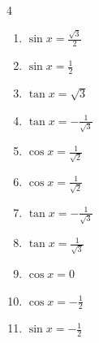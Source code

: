 \begin{multicols}{4}
\begin{enumerate}
  \item $\displaystyle \sin{x}  = \frac{\sqrt{3}}{2}$


  \item $\displaystyle \sin{x}  = \frac{1}{2}$


  \item $\displaystyle \tan{x}  = \sqrt{3}$


  \item $\displaystyle \tan{x}  = -\frac{1}{\sqrt{3}}$


  \item $\displaystyle \cos{x}  = \frac{1}{\sqrt{2}}$


  \item $\displaystyle \cos{x}  = \frac{1}{\sqrt{2}}$


  \item $\displaystyle \tan{x}  = -\frac{1}{\sqrt{3}}$


  \item $\displaystyle \tan{x}  = \frac{1}{\sqrt{3}}$


  \item $\displaystyle \cos{x}  = 0$


  \item $\displaystyle \cos{x}  = -\frac{1}{2}$


  \item $\displaystyle \sin{x}  = -\frac{1}{2}$



\end{enumerate}
\end{multicols}
